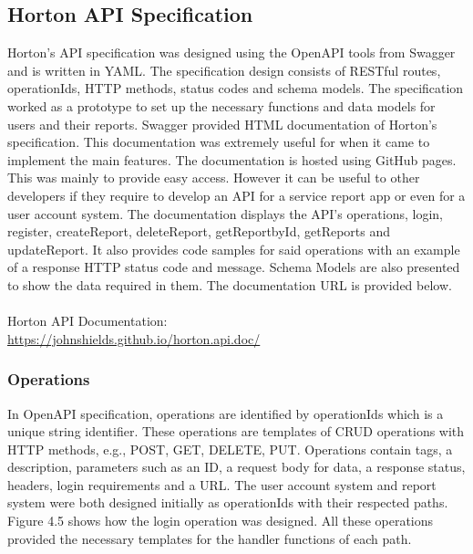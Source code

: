 \subsection{Horton API Specification}
Horton's API specification was designed using the OpenAPI tools from Swagger and is written in YAML. The specification design consists of RESTful routes, operationIds, HTTP methods, status codes and schema models. 
The specification worked as a prototype to set up the necessary functions and data models for users and their reports. 
Swagger provided HTML documentation of Horton's specification. This documentation was extremely useful for when it came to implement the main features. The documentation is hosted using GitHub pages. This was mainly to provide easy access. However it can be useful to other developers if they require to develop an API for a service report app or even for a user account system. The documentation displays the API's operations, login, register, createReport, deleteReport, getReportbyId, getReports and updateReport. It also provides code samples for said operations with an example of a response HTTP status code and message. Schema Models are also presented to show the data required in them. The documentation URL is provided below.
\\\\ Horton API Documentation: \\ 
\url{https://johnshields.github.io/horton.api.doc/}

\subsubsection{Operations}
In OpenAPI specification, operations are identified by operationIds which is a unique string identifier. These operations are templates of CRUD operations with HTTP methods, e.g., POST, GET, DELETE, PUT. Operations contain tags, a description, parameters such as an ID, a request body for data, a response status, headers, login requirements and a URL. The user account system and report system were both designed initially as operationIds with their respected paths. Figure 4.5 shows how the login operation was designed. All these operations provided the necessary templates for the handler functions of each path. 


